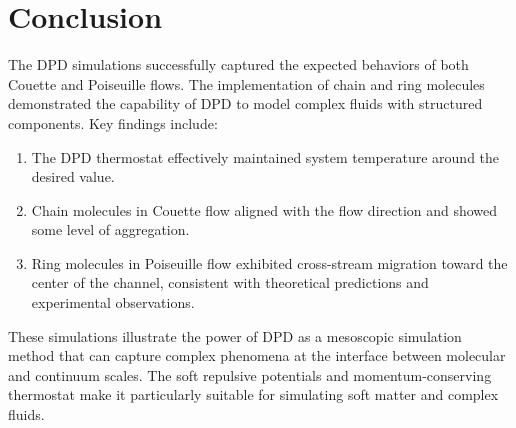 \section*{Conclusion}
The DPD simulations successfully captured the expected behaviors of both Couette and Poiseuille flows. The implementation of chain and ring molecules demonstrated the capability of DPD to model complex fluids with structured components.
Key findings include:
\begin{enumerate}
	\item The DPD thermostat effectively maintained system temperature around the desired value.
	\item Chain molecules in Couette flow aligned with the flow direction and showed some level of aggregation.
	\item Ring molecules in Poiseuille flow exhibited cross-stream migration toward the center of the channel, consistent with theoretical predictions and experimental observations.
\end{enumerate}
These simulations illustrate the power of DPD as a mesoscopic simulation method that can capture complex phenomena at the interface between molecular and continuum scales. The soft repulsive potentials and momentum-conserving thermostat make it particularly suitable for simulating soft matter and complex fluids.
